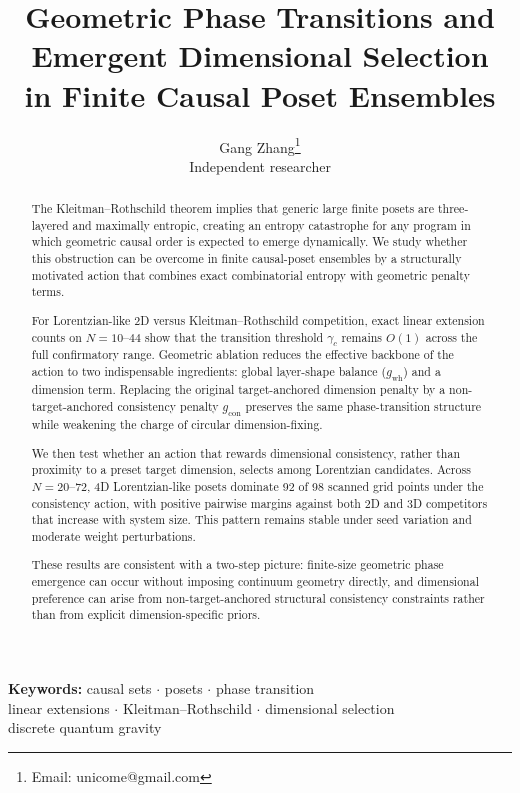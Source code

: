 \documentclass[12pt,a4paper]{article}
\title{Geometric Phase Transitions and Emergent Dimensional Selection\\
in Finite Causal Poset Ensembles}
\author{}
\date{}
\author{Gang Zhang\thanks{Email: unicome@gmail.com}\\
\small Independent researcher}
\date{}
\begin{document}
\maketitle

\begin{abstract}
The Kleitman--Rothschild theorem implies that generic large finite posets are
three-layered and maximally entropic, creating an entropy catastrophe for any
program in which geometric causal order is expected to emerge dynamically. We
study whether this obstruction can be overcome in finite causal-poset ensembles
by a structurally motivated action that combines exact combinatorial entropy
with geometric penalty terms.

For Lorentzian-like 2D versus Kleitman--Rothschild competition, exact linear
extension counts on $N=10$--$44$ show that the transition threshold
$\gamma_c$ remains $O(1)$ across the full confirmatory range. Geometric
ablation reduces the effective backbone of the action to two indispensable
ingredients: global layer-shape balance ($g_{\mathrm{wh}}$) and a dimension
term. Replacing the original target-anchored dimension penalty by a
non-target-anchored consistency penalty $g_{\mathrm{con}}$ preserves the same
phase-transition structure while weakening the charge of circular
dimension-fixing.

We then test whether an action that rewards dimensional consistency, rather
than proximity to a preset target dimension, selects among Lorentzian
candidates. Across $N=20$--$72$, 4D Lorentzian-like posets dominate 92 of 98
scanned grid points under the consistency action, with positive pairwise
margins against both 2D and 3D competitors that increase with system size. This
pattern remains stable under seed variation and moderate weight perturbations.

These results are consistent with a two-step picture: finite-size geometric
phase emergence can occur without imposing continuum geometry directly, and
dimensional preference can arise from non-target-anchored structural
consistency constraints rather than from explicit dimension-specific priors.
\end{abstract}

\noindent\textbf{Keywords:} causal sets $\cdot$ posets $\cdot$ phase transition\\
linear extensions $\cdot$
Kleitman--Rothschild $\cdot$ dimensional selection\\
discrete quantum gravity
\end{document}
